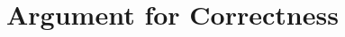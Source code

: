 
\begin{comment}
\begin{code}
import Prelude hiding (($),(/))
import Data.List

infixr 1  $
infixr 0  ==>
(==>) :: Bool -> Bool -> Bool
($) :: (a -> b) -> a -> b

type FuncName = String
type CtorName = String
type VarName = String

freeVars :: Expr -> [String]
body   :: FuncName  -> Expr
args   :: FuncName  -> [VarName]
var    :: VarName   -> Maybe (Expr, Selector)
ctors  :: CtorName  -> [CtorName]
type Selector  =  (CtorName, Int)

precond   :: FuncName -> Prop (Sat VarName)
prePost   :: FuncName -> Constraint -> Prop (Sat VarName)
pre ::  Expr -> Prop (Sat Expr)
reduce    :: Prop (Sat Expr) -> Prop (Sat VarName)
red :: Expr -> Constraint -> Prop (Sat VarName)
substP :: Eq alpha => [(alpha,beta)] -> Prop (Sat alpha) -> Prop (Sat beta)

data Sat alpha = Sat alpha Constraint
instance Eq a => Eq (Sat a)

(-<)  :: alpha -> [CtorName] -> Prop (Sat alpha)
(|>)  :: Selector -> Constraint -> Constraint
(<|)  :: CtorName -> Constraint -> Prop (Sat Int)

data Prop alpha
instance Eq a => Eq (Prop a)

propAnd, propOr           :: Prop alpha -> Prop alpha -> Prop alpha
propAnds, propOrs         :: [Prop alpha] -> Prop alpha
propMap                   :: (alpha -> Prop beta) -> Prop alpha -> Prop beta
propTrue, propFalse       :: Prop alpha
propBool                  :: Bool -> Prop alpha
propLit                   :: alpha -> Prop alpha

data Constraint = Constraint

class Subst a b c | c -> b, a -> b where (/) :: a -> b -> c
instance Subst Expr ([VarName], [Expr]) Expr
instance Subst a b c => Subst (Prop a) b (Prop c)
instance (Eq a, Eq b) => Subst (Sat a) ([a], [b]) (Sat b)

instance Eq Val
\end{code}
\end{comment}


\section{Argument for Correctness}
\label{secC:correct}

